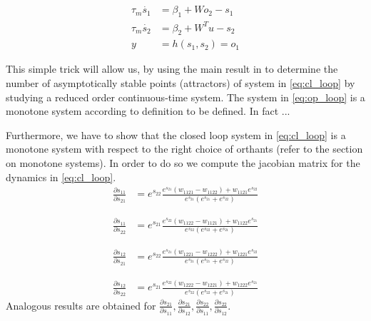 \begin{equation}
\begin{aligned}
\tau_m \dot{s_1} &= \beta_{1} + Wo_{2}-s_{1} \\
\tau_m \dot{s_2} &= \beta_{2} + W^{T}u-s_{2} \\
y & = h(s_1, s_2) = o_1
\end{aligned}
\label{eq:op_loop}
\end{equation}

This simple trick will allow us, by using the main result in \cite{enciso2005monotone} to determine the number of asymptotically stable points (attractors) of system in \eqref{eq:cl_loop} by studying a reduced order continuous-time system. The system in \eqref{eq:op_loop} is a monotone system according to definition to be defined. In fact ...

Furthermore, we have to show that   the closed loop system in \eqref{eq:cl_loop} is a monotone system with respect to the right choice of orthants (refer to the section on monotone systems). In order to do so we compute the jacobian matrix for the dynamics in \eqref{eq:cl_loop}.
\begin{equation}
\begin{aligned}
\frac{\partial s_{11}}{\partial s_{21}} &= e^{s_{22}} \frac{e^{s_{21}}(w_{1121} - w_{1122}) + w_{1121}e^{s_{22}}    }{e^{s_{21}}(e^{s_{21}}+ e^{s_{22}})} 
\end{aligned}
\label{eq:jac_s1121}
\end{equation}


\begin{equation}
\begin{aligned}
\frac{\partial s_{11}}{\partial s_{22}} &= e^{s_{21}} \frac{e^{s_{22}}(w_{1122} - w_{1121}) + w_{1122}e^{s_{21}}    }{e^{s_{22}}(e^{s_{22}}+ e^{s_{21}})} 
\end{aligned}
\label{eq:jac_s1122}
\end{equation}


\begin{equation}
\begin{aligned}
\frac{\partial s_{12}}{\partial s_{21}} &= e^{s_{22}} \frac{e^{s_{21}}(w_{1221} - w_{1222}) + w_{1221}e^{s_{22}}    }{e^{s_{21}}(e^{s_{21}}+ e^{s_{22}})} 
\end{aligned}
\label{eq:jac_s1221}
\end{equation}


\begin{equation}
\begin{aligned}
\frac{\partial s_{12}}{\partial s_{22}} &= e^{s_{21}} \frac{e^{s_{22}}(w_{1222} - w_{1221}) + w_{1222}e^{s_{21}}    }{e^{s_{22}}(e^{s_{22}}+ e^{s_{21}})} 
\end{aligned}
\label{eq:jac_s1222}
\end{equation}
Analogous results are obtained for $\frac{\partial s_{21}}{\partial s_{11}}, \frac{\partial s_{21}}{\partial s_{12}}, \frac{\partial s_{22}}{\partial s_{11}}, \frac{\partial s_{22}}{\partial s_{12}}$. 

